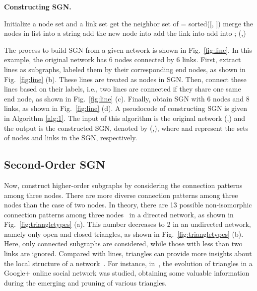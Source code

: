 \documentclass[10pt,journal,compsoc]{IEEEtran}
\begin{document}
\begin{algorithm}[!t]
\caption{\textbf{Constructing SGN.}}
\label{alg:1}
Initialize a node set  and a link set \;
{
    get the neighbor set  of \;
          { = sorted([, ])\;
            merge the nodes in list  into a string\;
          add the new node  into \;}
          {add the link  into \;}
    add  into ;
}
\Return (,)\;
\end{algorithm}

The process to build SGN from a given network is shown in Fig.~\ref{fig:line}. In this example, the original network has 6 nodes connected by 6 links. First, extract lines as subgraphs, labeled them by their corresponding end nodes, as shown in Fig.~\ref{fig:line} (b). These lines are treated as nodes in SGN. Then, connect these lines based on their labels, i.e., two lines are connected if they share one same end node, as shown in Fig.~\ref{fig:line} (c). Finally, obtain SGN with 6 nodes and 8 links, as shown in Fig.~\ref{fig:line} (d). A pseudocode of constructing SGN is given in Algorithm \ref{alg:1}. The input of this algorithm is the original network (,) and the output is the constructed SGN, denoted by (,), where  and  represent the sets of nodes and links in the SGN, respectively.

\subsection{Second-Order SGN}
Now, construct higher-order subgraphs by considering the connection patterns among three nodes. There are more diverse connection patterns among three nodes than the case of two nodes. In theory, there are 13 possible non-isomorphic connection patterns among three nodes~\cite{wernicke2006efficient} in a directed network, as shown in Fig.~\ref{fig:triangletypes} (a). This number decreases to 2 in an undirected network, namely only open and closed triangles, as shown in Fig.~\ref{fig:triangletypes} (b). Here, only connected subgraphs are considered, while those with less than two links are ignored. Compared with lines, triangles can provide more insights about the local structure of a network~\cite{eckmann2002curvature}. For instance, in~\cite{schioberg2015evolution}, the evolution of triangles in a Google+ online social network was studied, obtaining some valuable information during the emerging and pruning of various triangles.
\end{document}
